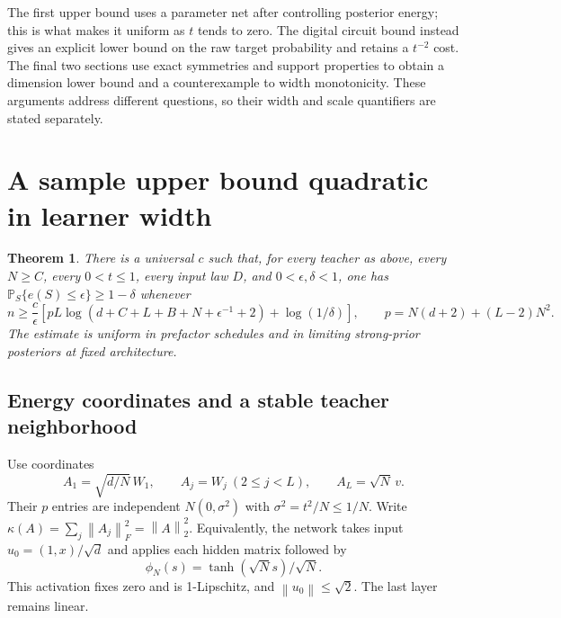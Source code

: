 \documentclass[11pt]{article}
\newtheorem{theorem}{Theorem}[section]
\theoremstyle{remark}\newtheorem{remark}[theorem]{Remark}
\newcommand{\Prb}{\mathbb P}
\newcommand{\norm}[1]{\left\lVert #1\right\rVert}
\begin{document}
The first upper bound uses a parameter net after controlling posterior
energy; this is what makes it uniform as $t$ tends to zero. The digital
circuit bound instead gives an explicit lower bound on the raw target
probability and retains a $t^{-2}$ cost. The final two sections use exact
symmetries and support properties to obtain a dimension lower bound and
a counterexample to width monotonicity. These arguments address different
questions, so their width and scale quantifiers are stated separately.

\section{A sample upper bound quadratic in learner width}

\begin{theorem}\label{thm:upper}
There is a universal $c$ such that, for every teacher as above, every
$N\ge C$, every $0<t\le1$, every input law $D$, and
$0<\epsilon,\delta<1$, one has $\Prb_S\{e(S)\le\epsilon\}\ge1-\delta$
whenever
\[
 n\ge\frac c\epsilon\left[
 pL\log(d+C+L+B+N+\epsilon^{-1}+2)+\log(1/\delta)\right],
 \qquad p=N(d+2)+(L-2)N^2.
\]
The estimate is uniform in prefactor schedules and in limiting
strong-prior posteriors at fixed architecture.
\end{theorem}

\subsection{Energy coordinates and a stable teacher neighborhood}

Use coordinates
\[
 A_1=\sqrt{d/N}\,W_1,\qquad A_j=W_j\ (2\le j<L),
 \qquad A_L=\sqrt N\,v.
\]
Their $p$ entries are independent $N(0,\sigma^2)$ with
$\sigma^2=t^2/N\le1/N$. Write
$\kappa(A)=\sum_j\norm{A_j}_F^2=\norm A_2^2$.
Equivalently, the network takes input $u_0=(1,x)/\sqrt d$ and applies
each hidden matrix followed by
\[
 \phi_N(s)=\tanh(\sqrt N s)/\sqrt N.
\]
This activation fixes zero and is 1-Lipschitz, and
$\norm{u_0}\le\sqrt2$. The last layer remains linear.
\end{document}
